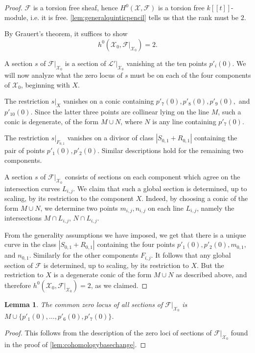 \documentclass[reqno, 11pt]{amsart}
\theoremstyle{definition}
\theoremstyle{remark}
\numberwithin{equation}{section}
\numberwithin{thm}{section}
\numberwithin{prop}{section}
\numberwithin{lem}{section}
\numberwithin{cor}{section}
\numberwithin{conj}{section}
\numberwithin{defn}{section}
\theoremstyle{plain}
\newtheorem{lemma}[theorem]{Lemma}
\theoremstyle{definition}
\newcommand\scf{\mathscr F}
\newcommand\scl{\mathscr L}
\newcommand\scx{\mathscr X}
\begin{document}
\begin{proof}
$\scf$ is a torsion free sheaf, hence $H^{0}(\scx, \scf)$ is a torsion free $k[[t]]$-module, i.e. it is free. \autoref{lem:generalquinticpencil} tells us that the rank must be $2$.

By Grauert's theorem, it suffices to show \[h^{0}(\scx_{0}, \scf|_{\scx_{0}}) = 2.\]  


A section $s$ of $\scf|_{\scx_{0}}$ is a section of $\scl ' |_{\scx_{0}}$ vanishing at the ten points $p'_{i}(0)$. We will now analyze what the zero locus of $s$ must be on each of the four components of $\scx_{0}$, beginning with $X$. 

The restriction $s|_{X}$ vanishes on a conic containing $p'_{7}(0), p'_{8}(0), p'_{9}(0),$ and $p'_{10}(0)$. Since the latter three points are collinear lying on the line $M$, such a conic is degenerate, of the form $M \cup N$, where $N$ is any line containing $p'_{7}(0)$. 

The restriction $s|_{F_{0,1}}$ vanishes on a divisor of class $|S_{0,1} + R_{0,1}|$ containing the pair of points $p'_{1}(0), p'_{2}(0)$.  Similar descriptions hold for the remaining two components. 

A section $s$ of $\scf |_{\scx_{0}}$ consists of sections on each component which agree on the intersection curves $L_{i,j}$. 
We claim that such a global section is determined, up to scaling, by its restriction to the component $X$.  Indeed, by choosing a conic of the form $M \cup N$, we determine two points $m_{i,j}, n_{i,j}$ on each line $L_{i,j}$, namely the intersections $M \cap L_{i,j}$, $N \cap L_{i,j}$.  

From the generality assumptions we have imposed, we get that there is a unique curve in the class $|S_{0,1} + R_{0,1}|$ containing the four points  $p'_{1}(0), p'_{2}(0), m_{0,1},$ and $n_{0,1}$.  Similarly for the other components $F_{i,j}$. 
It follows that any global section of $\scf$ is determined, up to scaling, by its restriction to $X$. But the restriction to $X$ is a degenerate conic of the form $M \cup N$ as described above, and therefore $h^{0}(\scx_{0}, \scf|_{\scx_{0}}) = 2$, as we claimed. 
\end{proof}

\begin{lemma}\label{lem:centralbaselocus}
The common zero locus of all sections of $\scf |_{\scx_{0}}$ is $M \cup \{p'_{1}(0) , ... , p'_{6}(0) , p'_{7}(0)\}$.
\end{lemma}


\begin{proof}
This follows from the description of the zero loci of sections of  $\scf |_{\scx_{0}}$ found in the proof of \autoref{lem:cohomologybasechange}.
\end{proof} 
\end{document}
